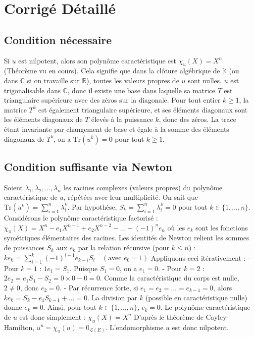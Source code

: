 \documentclass[11pt,a4paper]{article}
\begin{document}
\section{Corrigé Détaillé}

\subsection{Condition nécessaire}
Si $u$ est nilpotent, alors son polynôme caractéristique est $\chi_u(X) = X^n$ (Théorème vu en cours).
Cela signifie que dans la clôture algébrique de $\mathbb{K}$ (ou dans $\mathbb{C}$ si on travaille sur $\mathbb{R}$), toutes les valeurs propres de $u$ sont nulles.
$u$ est trigonalisable dans $\mathbb{C}$, donc il existe une base dans laquelle sa matrice $T$ est triangulaire supérieure avec des zéros sur la diagonale.
Pour tout entier $k \ge 1$, la matrice $T^k$ est également triangulaire supérieure, et ses éléments diagonaux sont les éléments diagonaux de $T$ élevés à la puissance $k$, donc des zéros.
La trace étant invariante par changement de base et égale à la somme des éléments diagonaux de $T^k$, on a $\text{Tr}(u^k) = 0$ pour tout $k \ge 1$.

\subsection{Condition suffisante via Newton}
Soient $\lambda_1, \lambda_2, \dots, \lambda_n$ les racines complexes (valeurs propres) du polynôme caractéristique de $u$, répétées avec leur multiplicité.
On sait que $\text{Tr}(u^k) = \sum_{i=1}^n \lambda_i^k$.
Par hypothèse, $S_k = \sum_{i=1}^n \lambda_i^k = 0$ pour tout $k \in \{1, \dots, n\}$.
Considérons le polynôme caractéristique factorisé :
$\chi_u(X) = X^n - e_1 X^{n-1} + e_2 X^{n-2} - \dots + (-1)^n e_n$
où les $e_k$ sont les fonctions symétriques élémentaires des racines.
Les identités de Newton relient les sommes de puissances $S_k$ aux $e_k$ par la relation récursive (pour $k \le n$) :
$k e_k = \sum_{i=1}^k (-1)^{i-1} e_{k-i} S_i \quad (\text{avec } e_0 = 1)$
Appliquons ceci itérativement :
- Pour $k=1$ : $1 e_1 = S_1$. Puisque $S_1 = 0$, on a $e_1 = 0$.
- Pour $k=2$ : $2 e_2 = e_1 S_1 - S_2 = 0 \times 0 - 0 = 0$. Comme la caractéristique du corps est nulle, $2 \neq 0$, donc $e_2 = 0$.
- Par récurrence forte, si $e_1 = e_2 = \dots = e_{k-1} = 0$,
  alors $k e_k = S_k - e_1 S_{k-1} + \dots = 0$.
  La division par $k$ (possible en caractéristique nulle) donne $e_k = 0$.
Ainsi, pour tout $k \in \{1, \dots, n\}$, $e_k = 0$.
Le polynôme caractéristique de $u$ est donc simplement :
$\chi_u(X) = X^n$
D'après le théorème de Cayley-Hamilton, $u^n = \chi_u(u) = 0_{\mathcal{L}(E)}$.
L'endomorphisme $u$ est donc nilpotent.
\end{document}
